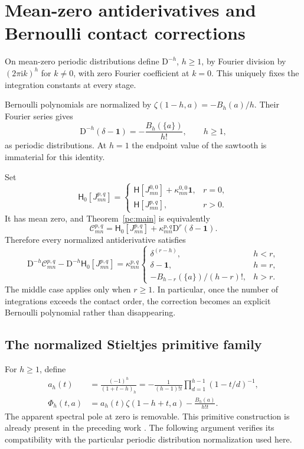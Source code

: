 \documentclass[11pt,a4paper]{article}
\numberwithin{equation}{section}
\theoremstyle{definition}
\newcommand{\ii}{\mathrm i}
\newcommand{\D}{\mathrm D}
\newcommand{\HH}{\mathsf H}
\newcommand{\CC}{\mathcal C}
\newcommand{\one}{\mathbf 1}
\begin{document}
\section{Mean-zero antiderivatives and Bernoulli contact corrections}\label{pc:antiderivatives}
On mean-zero periodic distributions define $\D^{-h}$, $h\ge1$, by Fourier division by $(2\pi\ii k)^h$ for $k\ne0$, with zero Fourier coefficient at $k=0$. This uniquely fixes the integration constants at every stage.

Bernoulli polynomials are normalized by $\zeta(1-h,a)=-B_h(a)/h$. Their Fourier series \cite{pc:bernoulli} gives
\begin{equation}\label{pc:delta-primitive}
\D^{-h}(\delta-\one)=-\frac{B_h(\{a\})}{h!},\qquad h\ge1,
\end{equation}
as periodic distributions. At $h=1$ the endpoint value of the sawtooth is immaterial for this identity.

Set
\begin{equation}\label{pc:H0}
\HH_0[J_{mn}^{p,q}]=
\begin{cases}\HH[J_{mn}^{0,0}]+\kappa_{mn}^{0,0}\one,&r=0,\\
\HH[J_{mn}^{p,q}],&r>0.
\end{cases}
\end{equation}
It has mean zero, and Theorem~\ref{pc:main} is equivalently
\begin{equation}\label{pc:main-mean-zero}
\CC_{mn}^{p,q}=\HH_0[J_{mn}^{p,q}]
+\kappa_{mn}^{p,q}\D^r(\delta-\one).
\end{equation}
Therefore every normalized antiderivative satisfies
\begin{equation}\label{pc:primitive-contact}
\D^{-h}\CC_{mn}^{p,q}-\D^{-h}\HH_0[J_{mn}^{p,q}]
=\kappa_{mn}^{p,q}
\begin{cases}
\delta^{(r-h)},&h<r,\\
\delta-\one,&h=r,\\
-B_{h-r}(\{a\})/(h-r)!,&h>r.
\end{cases}
\end{equation}
The middle case applies only when $r\ge1$. In particular, once the number of integrations exceeds the contact order, the correction becomes an explicit Bernoulli polynomial rather than disappearing.

\subsection{The normalized Stieltjes primitive family}
For $h\ge1$, define
\begin{align}
a_h(t)&=\frac{(-1)^h}{(1+t-h)_h}
=-\frac1{(h-1)!t}\prod_{d=1}^{h-1}(1-t/d)^{-1},\label{pc:ah}\\
\Phi_h(t,a)&=a_h(t)\zeta(1-h+t,a)-\frac{B_h(a)}{h!t}.\label{pc:Phi}
\end{align}
The apparent spectral pole at zero is removable. This primitive construction is already present in the preceding work \cite{pc:coincident,pc:shifted}. The following argument verifies its compatibility with the particular periodic distribution normalization used here.
\end{document}

